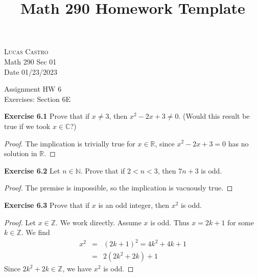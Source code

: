 \documentclass[12pt,oneside]{article}
\newenvironment{exercise}[1]{\vspace{.1in}\noindent\textbf{Exercise #1 \hspace{.05em}}}{}
\newcommand{\R}{\mathbb{R}}
\newcommand{\C}{\mathbb{C}}
\newcommand{\Z}{\mathbb{Z}}
\newcommand{\N}{\mathbb{N}}
\begin{document}
\title{Math 290 Homework Template}

\begin{flushright}
\textsc{Lucas Castro}  \\
Math 290 Sec 01\\
Date 01/23/2023
\end{flushright}

\begin{center}
\textsf{Assignment HW 6} \\
\textsf{Exercises: Section 6E}
\end{center}


\begin{exercise}{6.1}
Prove that if $x \neq 3$, then $x^2 - 2x + 3 \neq 0$. (Would this result be true if we took $x \in \C$?)
\end{exercise}

\begin{proof}
The implication is trivially true for $x \in \R$, since $x^2 - 2x + 3 = 0$ has no solution in $\R$.
\end{proof}



\begin{exercise}{6.2}
Let $n \in \N$. Prove that if $2<n<3$, then $7n + 3$ is odd. 
\end{exercise}

\begin{proof}
The premise is impossible, so the implication is vacuously true.
\end{proof}



\begin{exercise}{6.3}
Prove that if $x$ is an odd integer, then $x^2$ is odd.
\end{exercise}

\begin{proof}
Let $x \in \Z$. We work directly. Assume $x$ is odd. Thus $x = 2k + 1$ for some $k \in \Z$. We find
\begin{eqnarray*}
x^2  &=& (2k + 1)^2 = 4k^2 + 4k + 1 \\
&=& 2(2k^2 + 2k) + 1
\end{eqnarray*}
Since $2k^2 + 2k \in \Z$, we have $x^2$ is odd.
\end{proof}
\end{document}
